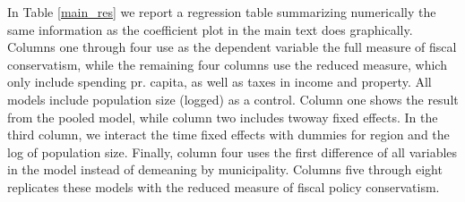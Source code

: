 \documentclass[a4paper,12pt]{article}
\begin{document}
In Table \ref{main_res} we report a regression table summarizing  numerically the same information as the coefficient plot in the main text does graphically. Columns one through four use as the dependent variable the full measure of fiscal conservatism, while the remaining four columns use the reduced measure, which only include spending pr. capita, as well as taxes in income and property. All models include population size (logged) as a control. Column one shows the result from the pooled model, while column two includes twoway fixed effects. In the third column, we interact the time fixed effects with dummies for region and the log of population size. Finally, column four uses the first difference of all variables in the model instead of demeaning by municipality. Columns five through eight replicates these models with the reduced measure of fiscal policy conservatism. 
\end{document}
